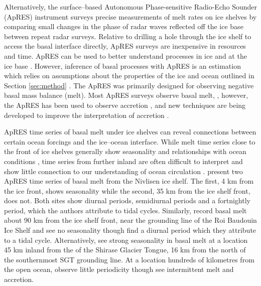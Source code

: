 Alternatively, the surface--based Autonomous Phase-sensitive Radio-Echo Sounder (ApRES) instrument surveys precise measurements of melt rates on ice shelves by comparing small changes in the phase of radar waves reflected off the ice base between repeat radar surveys. 
Relative to drilling a hole through the ice shelf to access the basal interface directly, ApRES surveys are inexpensive in resources and time. ApRES can be used to better understand processes in ice \citep[e.g.][]{case2022phase} and at the ice base \citep[e.g.][]{sun2019topographic}.  However, inference of basal processes with ApRES is an estimation which relies on assumptions about the properties of the ice and ocean outlined in Section \ref{sec:method} \cite{brennan2014phase}.
The ApRES was primarily designed for observing negative basal mass balance (melt). Most ApRES surveys observe basal melt, \citep[e.g.][] {lindback2019spatial,davis2018variability}, however, the ApRES has been used to observe accretion \citep[e.g.][] {stewart2018ice}, and new techniques are being developed to improve the interpretation of accretion \citep{vavnkova2020observations}. 


ApRES time series of basal melt under ice shelves can reveal connections between certain ocean forcings and the ice--ocean interface. While melt time series close to the front of ice shelves generally show seasonality and relationships with ocean conditions \citep[e.g.][]{lindback2019spatial}, time series from further inland are often difficult to interpret and show little connection to our understanding of ocean circulation \citep[e.g.][]{davis2018variability}. 
\cite{lindback2019spatial} present two ApRES time series of basal melt from the Nivlisen ice shelf. The first, 4 km from the ice front, shows seasonality while the second, 35 km from the ice shelf front, does not. Both sites show diurnal periods, semidiurnal periods and a fortnightly period, which the authors attribute to tidal cycles. 
Similarly, \citet{sun2019topographic} record basal melt about 90 km from the ice shelf front, near the grounding line of the Roi Baudouin Ice Shelf and see no seasonality though find a diurnal period which they attribute to a tidal cycle. 
Alternatively, \cite{hirano2020strong} see strong seasonality in basal melt at a location 45 km inland from the of the Shirase Glacier Tongue, 16 km from the north of the southernmost SGT grounding line.
At a location hundreds of kilometres from the open ocean, \citet{vavnkova2020observations} observe little periodicity though see intermittent melt and accretion. 


